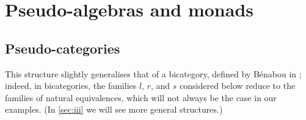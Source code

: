 \documentclass{article}
\newcommand{\oldpage}[1]{\marginpar{\footnotesize$\Big\vert$ \textit{p.~#1}}}
\begin{document}
\section{Pseudo-algebras and monads}
\label{sec:ii}

\subsection{Pseudo-categories}
\label{sec:ii.1}
\oldpage{243}

This structure slightly generalises that of a bicategory, defined by Bénabou in \cite{Be};
indeed, in bicategories, the families $l$, $r$, and $s$ considered below reduce to the families of natural equivalences, which will not always be the case in our examples.
(In \cref{sec:iii} we will see more general structures.)
\end{document}
